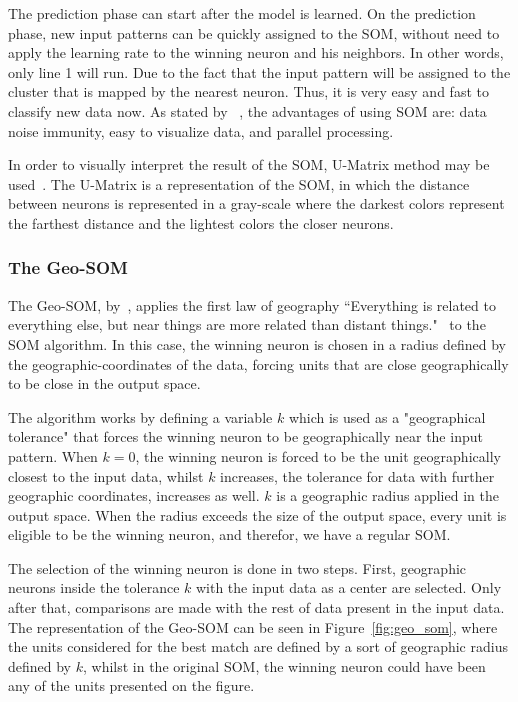 \documentclass[journal]{IEEEtran}
\begin{document}
The prediction phase can start after the model is learned. On the prediction phase, new input patterns can be quickly assigned to the \ac{SOM}, without need to apply the learning rate to the winning neuron and his neighbors. In other words, only line 1 will run. Due to the fact that the input pattern will be assigned to the cluster that is mapped by the nearest neuron. Thus, it is very easy and fast to classify new data now. As stated by ~\citet{Liu2012b}, the advantages of using \ac{SOM} are: data noise immunity, easy to visualize data, and parallel processing.

In order to visually interpret the result of the \ac{SOM}, \ac{U-Matrix} method may be used~\citep{Bacao2005}. The \ac{U-Matrix} is a representation of the \ac{SOM}, in which the distance between neurons is represented in a gray-scale where the darkest colors represent the farthest distance and the lightest colors the closer neurons.

\subsubsection{The Geo-SOM} 
\label{sub:types_of_soms}
The Geo-SOM, by~\citet{Bacao2005}, applies the first law of geography “Everything is related to everything else, but near things are more related than distant things."~\cite{citeulike:612692} to the \ac{SOM} algorithm. In this case, the winning neuron is chosen in a radius defined by the geographic-coordinates of the data, forcing units that are close geographically to be close in the output space.

The algorithm works by defining a variable $k$ which is used as a "geographical tolerance" that forces the winning neuron to be geographically near the input pattern. When $k=0$, the winning neuron is forced to be the unit geographically closest to the input data, whilst $k$ increases, the tolerance for data with further geographic coordinates, increases as well. $k$ is a geographic radius applied in the output space. When the radius exceeds the size of the output space, every unit is eligible to be the winning neuron, and therefor, we have a regular \ac{SOM}.

The selection of the winning neuron is done in two steps. First, geographic neurons inside the tolerance $k$ with the input data as a center are selected. Only after that, comparisons are made with the rest of data present in the input data. The representation of the Geo-SOM can be seen in Figure~\ref{fig:geo_som}, where the units considered for the best match are defined by a sort of geographic radius defined by $k$, whilst in the original \ac{SOM}, the winning neuron could have been any of the units presented on the figure.
\end{document}
